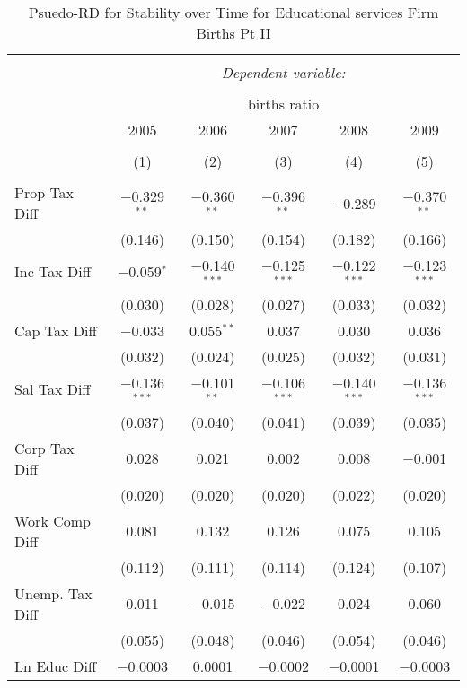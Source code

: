 
\begin{table}[!htbp] \centering 
  \caption{Psuedo-RD for Stability over Time for  Educational services Firm Births Pt II} 
  \label{61year} 
\small 
\begin{tabular}{@{\extracolsep{5pt}}lccccc} 
\\[-1.8ex]\hline 
\hline \\[-1.8ex] 
 & \multicolumn{5}{c}{\textit{Dependent variable:}} \\ 
\cline{2-6} 
\\[-1.8ex] & \multicolumn{5}{c}{births ratio} \\ 
 & 2005 & 2006 & 2007 & 2008 & 2009 \\ 
\\[-1.8ex] & (1) & (2) & (3) & (4) & (5)\\ 
\hline \\[-1.8ex] 
 Prop Tax Diff & $-$0.329$^{**}$ & $-$0.360$^{**}$ & $-$0.396$^{**}$ & $-$0.289 & $-$0.370$^{**}$ \\ 
  & (0.146) & (0.150) & (0.154) & (0.182) & (0.166) \\ 
  Inc Tax Diff & $-$0.059$^{*}$ & $-$0.140$^{***}$ & $-$0.125$^{***}$ & $-$0.122$^{***}$ & $-$0.123$^{***}$ \\ 
  & (0.030) & (0.028) & (0.027) & (0.033) & (0.032) \\ 
  Cap Tax Diff & $-$0.033 & 0.055$^{**}$ & 0.037 & 0.030 & 0.036 \\ 
  & (0.032) & (0.024) & (0.025) & (0.032) & (0.031) \\ 
  Sal Tax Diff & $-$0.136$^{***}$ & $-$0.101$^{**}$ & $-$0.106$^{***}$ & $-$0.140$^{***}$ & $-$0.136$^{***}$ \\ 
  & (0.037) & (0.040) & (0.041) & (0.039) & (0.035) \\ 
  Corp Tax Diff & 0.028 & 0.021 & 0.002 & 0.008 & $-$0.001 \\ 
  & (0.020) & (0.020) & (0.020) & (0.022) & (0.020) \\ 
  Work Comp Diff & 0.081 & 0.132 & 0.126 & 0.075 & 0.105 \\ 
  & (0.112) & (0.111) & (0.114) & (0.124) & (0.107) \\ 
  Unemp. Tax Diff & 0.011 & $-$0.015 & $-$0.022 & 0.024 & 0.060 \\ 
  & (0.055) & (0.048) & (0.046) & (0.054) & (0.046) \\ 
  Ln Educ Diff & $-$0.0003 & 0.0001 & $-$0.0002 & $-$0.0001 & $-$0.0003 \\ 

\end{tabular}
\end{table}
